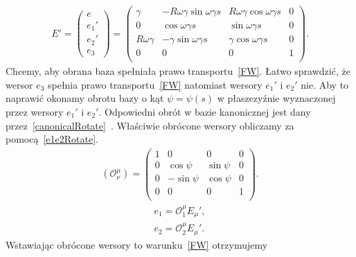 \begin{align}\label{Esimpleprim}
E'=
\begin{pmatrix}
e\\
e_1'\\
e_2'\\
e_3
\end{pmatrix}
=
\begin{pmatrix}
\gamma          & -R\omega\gamma\sin\omega\gamma s  
& R\omega\gamma\cos\omega\gamma s & 0 \\
0                   & \cos\omega\gamma s                   
&  \sin\omega\gamma s                & 0 \\
R\omega\gamma  & -\gamma\sin\omega\gamma    s           
& \gamma\cos\omega\gamma s           & 0 \\
0                   &   0                                           
& 0                                      & 1 \\
\end{pmatrix}.
\end{align}
Chcemy, aby obrana baza spełniała prawo transportu~\eqref{FW}. 
Łatwo sprawdzić, że wersor $e_3$ spełnia prawo 
transportu~\eqref{FW} natomiast wersory $e_1'$ i $e_2'$ nie.
Aby to naprawić
okonamy obrotu bazy o kąt $\psi=\psi(s)$ w płaszczyźnie wyznaczonej 
przez wersory $e_1'$ i $e_2'$. Odpowiedni obrót w bazie kanonicznej jest
dany przez~\eqref{canonicalRotate}~\cite{star1993algebra}.
Właściwie obrócone wersory obliczamy za pomocą~\eqref{e1e2Rotate}.
\begin{align}\label{canonicalRotate}
( \mathcal{O}^\mu_\nu )
=
\begin{pmatrix}
1 & 0           & 0             & 0 \\
0 & \cos\psi    & \sin\psi  & 0 \\
0 & -\sin\psi   & \cos\psi  & 0 \\
0 & 0           &0          & 1 \\
\end{pmatrix}.
\end{align}
\begin{align}\label{e1e2Rotate}
e_1 =  \mathcal{O}^\mu_1 E_\mu ', \\
e_2 =  \mathcal{O}^\mu_2 E_\mu ' .\nonumber
\end{align}
Wstawiając obrócone wersory to warunku~\eqref{FW} otrzymujemy 
